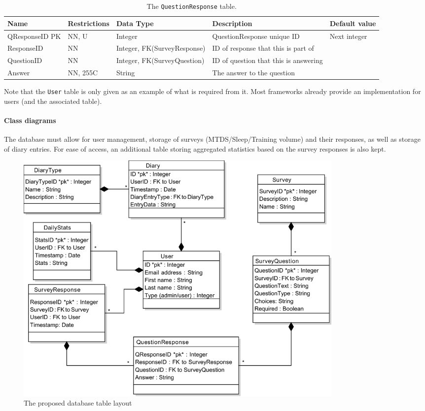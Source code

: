 \documentclass[a4paper, 11pt, titlepage]{article}
\begin{document}
\begin{table}[H]
  \centering
  \caption{The \texttt{QuestionResponse} table.}
    \begin{tabularx}{\textwidth}{llp{3.3cm}Xl}
    \hline
    Name  & Restrictions & Data Type & Description & Default value \\
    \hline
    QResponseID PK & NN, U & Integer & QuestionResponse unique ID & Next integer \\
    ResponseID & NN    & Integer, FK(SurveyResponse) & ID of response that this is part of &  \\
    QuestionID & NN    & Integer, FK(SurveyQuestion) & ID of question that this is answering &  \\
    Answer & NN, 255C & String & The answer to the question &  \\
    \hline
    \end{tabularx}%
  \label{tab:dd:QuestionResponse}%
\end{table}%

Note that the \texttt{User} table is only given as an example of what is required from it. Most frameworks already provide an implementation for users (and the associated table). 

\paragraph{Class diagrams}
The database must allow for user management, storage of surveys (MTDS/Sleep/Training volume) and their responses, as well as storage of diary entries. For ease of access, an additional table storing aggregated statistics based on the survey responses is also kept.

\begin{figure}[H]
	\centering
	\includegraphics[width=0.8\textwidth]{figures/object-models/db-schema.pdf}
	\caption{The proposed database table layout}
\end{figure}
\end{document}
